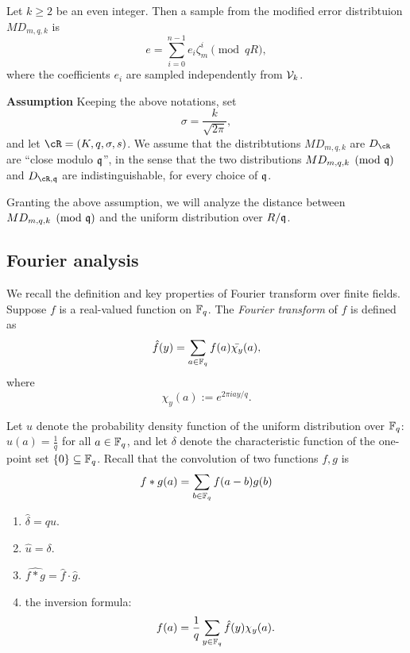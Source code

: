 \documentclass{amsart}
\begin{document}
\begin{Definition}
\label{def: modified distribution}
Let $k \geq 2$ be an even integer. Then a sample from the modified error distribtuion $MD_{m,q,k}$ is
\[
    e = \sum_{i=0}^{n-1} e_i \zeta_m^{i} \pmod{qR},
\]
where the coefficients $e_i$ are sampled independently from $\mathcal{V}_k$.
\end{Definition}

{\bf Assumption} Keeping the above notations, set
$$
    \sigma = \frac{k}{\sqrt{2 \pi}},
$$ and
let $\cR = (K, q, \sigma, s)$. We assume that the distribtutions $MD_{m,q,k}$ are $D_\cR$ are ``close modulo $\mathfrak{q}$'', in the sense that the two distributions $MD_{m,q,k} \pmod{\mathfrak{q}}$ and
$D_{\cR,\fq}$ are indistinguishable, for every choice of $\mathfrak{q}$.

Granting the above assumption, we will analyze the distance between $MD_{m,q,k} \pmod{\mathfrak{q}}$ and the uniform distribution over $R/\mathfrak{q}$.

\subsection{Fourier analysis}
We recall the definition and key properties of Fourier transform over finite fields.
Suppose $f$ is a real-valued function on $\mathbb{F}_q$. The {\it Fourier transform} of $f$ is defined as
\[
    \hat{f}(y) = \sum_{a \in \mathbb{F}_q} f(a) \bar{\chi_y}(a),
\]
where $$\chi_y(a) := e^{2 \pi i ay/q}.$$

Let $u$ denote the probability density function of the uniform distribution over $\mathbb{F}_q$: $u(a) = \frac{1}{q}$ for all $a \in \mathbb{F}_q$, and let $\delta$ denote the characteristic function of the
one-point set $\{0\} \subseteq \mathbb{F}_q$. Recall that the convolution of two functions $f,g$ is
\[
    f  \ast g  (a) = \sum_{b \in \mathbb{F}_q} f(a-b)g(b)
\]
\begin{Fact} \label{fact: basicfourier}\qquad
\begin{enumerate}
\item $\hat{\delta} = qu$.

\item  $\hat{u} = \delta$.

\item $\widehat{f \ast g} = \hat{f} \cdot \hat{g}$.


\item the inversion formula:
\[
    f(a) = \frac{1}{q} \sum_{y \in \mathbb{F}_q} \hat{f}(y)\chi_y(a).
\]

\end{enumerate}
\end{Fact}
\end{document}
